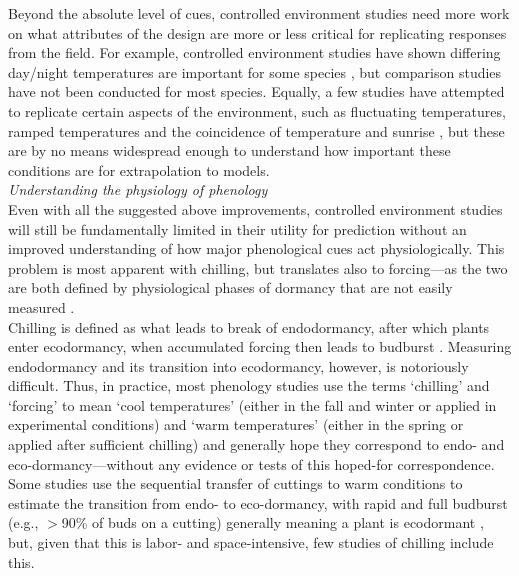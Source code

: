 \documentclass[11pt,letter]{article}
\begin{document}
Beyond the absolute level of cues, controlled environment studies need more work on what attributes of the design are more or less critical for replicating responses from the field. For example, controlled environment studies have shown differing day/night temperatures are important for some species \citep{heuvelink1989influence,abrol1996effects,Thingnaes2003,pressman2006exposing}, but comparison studies have not been conducted for most species. Equally, a few studies have attempted to replicate certain aspects of the environment, such as fluctuating temperatures, ramped temperatures and the coincidence of temperature and sunrise \citep{erwin1998}, but these are by no means widespread enough to understand how important these conditions are for extrapolation to models. \\

\emph{Understanding the physiology of phenology}\\
Even with all the suggested above improvements, controlled environment studies will still be fundamentally limited in their utility for prediction without an improved understanding of how major phenological cues act physiologically. This problem is most apparent with chilling, but translates also to forcing---as the two are both defined by physiological phases of dormancy that are not easily measured \citep{singh2019,chang2021}. \\

Chilling is defined as what leads to break of endodormancy, after which plants enter ecodormancy, when accumulated forcing then leads to budburst \citep{chuine2016}. Measuring endodormancy and its transition into ecodormancy, however, is notoriously difficult. Thus, in practice, most phenology studies use the terms `chilling' and `forcing' to mean `cool temperatures' (either in the fall and winter or applied in experimental conditions) and `warm temperatures' (either in the spring or applied after sufficient chilling) and generally hope they correspond to endo- and eco-dormancy---without any evidence or tests of this hoped-for correspondence. Some studies use the sequential transfer of cuttings to warm conditions to estimate the transition from endo- to eco-dormancy, with rapid and full budburst (e.g., $>$90\% of buds on a cutting) generally meaning a plant is ecodormant \citep[e.g.,][]{Junttila:2012aa}, but, given that this is labor- and space-intensive, few studies of chilling include this. \\
\end{document}
